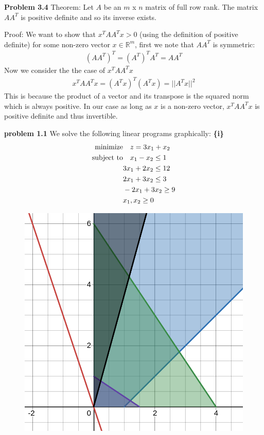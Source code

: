 \documentclass{article}
\begin{document}
\textbf{Problem 3.4} Theorem: Let $A$ be an $m$ x $n$ matrix of full row rank. The matrix $AA^T$ is positive definite and so its inverse exists. \newline 

    Proof: We want to show that $x^TAA^Tx > 0$ (using the definition of positive definite) for some non-zero vector $x \in \mathbb{R}^m$, first we note that $AA^T$ is symmetric:
\begin{align*}
    (AA^T)^T = (A^T)^TA^T = AA^T
\end{align*}
Now we consider the the case of $x^TAA^Tx$ 
\begin{align*}
    x^TAA^Tx = (A^Tx)^T(A^Tx) = ||A^Tx||^2
\end{align*}
    This is because the product of a vector and its transpose is the squared norm which is always positive. In our case as long as $x$ is a non-zero vector, $x^TAA^Tx$ is positive definite and thus invertible.

\textbf{problem 1.1} We solve the following linear programs graphically: \newline
\textbf{\{i\}}
    \begin{align*}
        \text{minimize} &\null \quad z = 3x_1 + x_2 \\ 
        \text{subject to} &\null \quad x_1 - x_2 \leq 1 \\
        & 3x_1 + 2x_2 \leq 12 \\
        & 2x_1 + 3x_2 \leq 3 \\
        & -2x_1 + 3x_2 \geq 9 \\
        & x_1, x_2 \geq 0
    \end{align*}
    \begin{figure}[H]
        \centering
        \includegraphics[scale = 0.35]{1.1(i).png}
    \end{figure}
\end{document}

